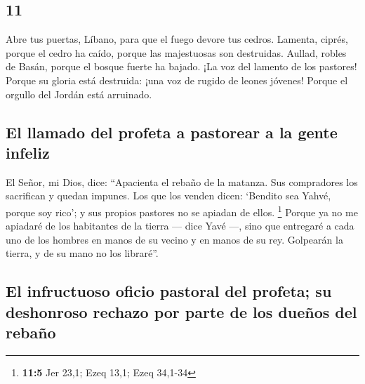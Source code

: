 \begin{paracol}{2}
\hypertarget{section-20}{%
\section{11}\label{section-20}}

 Abre tus puertas, Líbano, para que el fuego devore tus
cedros.  Lamenta, ciprés, porque el cedro ha caído, porque
las majestuosas son destruidas. Aullad, robles de Basán, porque el
bosque fuerte ha bajado.  ¡La voz del lamento de los
pastores! Porque su gloria está destruida: ¡una voz de rugido de leones
jóvenes! Porque el orgullo del Jordán está arruinado.

\hypertarget{el-llamado-del-profeta-a-pastorear-a-la-gente-infeliz}{%
\subsection{El llamado del profeta a pastorear a la gente
infeliz}\label{el-llamado-del-profeta-a-pastorear-a-la-gente-infeliz}}

 El Señor, mi Dios, dice: ``Apacienta el rebaño de la
matanza.  Sus compradores los sacrifican y quedan impunes.
Los que los venden dicen: `Bendito sea Yahvé, porque soy rico'; y sus
propios pastores no se apiadan de ellos. \footnote{\textbf{11:5} Jer
  23,1; Ezeq 13,1; Ezeq 34,1-34}  Porque ya no me apiadaré
de los habitantes de la tierra --- dice Yavé ---, sino que entregaré a
cada uno de los hombres en manos de su vecino y en manos de su rey.
Golpearán la tierra, y de su mano no los libraré''.

\hypertarget{el-infructuoso-oficio-pastoral-del-profeta-su-deshonroso-rechazo-por-parte-de-los-dueuxf1os-del-rebauxf1o}{%
\subsection{El infructuoso oficio pastoral del profeta; su deshonroso
rechazo por parte de los dueños del
rebaño}\label{el-infructuoso-oficio-pastoral-del-profeta-su-deshonroso-rechazo-por-parte-de-los-dueuxf1os-del-rebauxf1o}}


\end{paracol}
